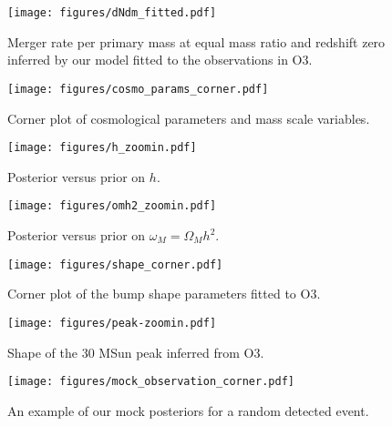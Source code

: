 \documentclass[modern]{aastex631}
\begin{document}
\begin{figure}
    \begin{center}
        \texttt{[image: figures/dNdm\_fitted.pdf]}
    \end{center}
    \caption{Merger rate per primary mass at equal mass ratio and redshift zero inferred by our model fitted to the observations in O3.}
    \label{fig:dNdm_fitted}
\end{figure}

\begin{figure}
    \begin{center}
        \texttt{[image: figures/cosmo\_params\_corner.pdf]}
    \end{center}
    \caption{Corner plot of cosmological parameters and mass scale variables.}
    \label{fig:cosmo-params-corner}
\end{figure}

\begin{figure}
    \begin{center}
        \texttt{[image: figures/h\_zoomin.pdf]}
    \end{center}
    \caption{Posterior versus prior on $h$.}
    \label{fig:h-zoomin}
\end{figure}

\begin{figure}
    \begin{center}
        \texttt{[image: figures/omh2\_zoomin.pdf]}
    \end{center}
    \caption{Posterior versus prior on $\omega_M = \Omega_M h^2$.}
    \label{fig:omh2-zoomin}
\end{figure}

\begin{figure}
    \begin{center}
        \texttt{[image: figures/shape\_corner.pdf]}
    \end{center}
    \caption{Corner plot of the bump shape parameters fitted to O3.}
    \label{fig:shape-corner}
\end{figure}

\begin{figure}
    \begin{center}
        \texttt{[image: figures/peak-zoomin.pdf]}
    \end{center}
    \caption{Shape of the 30 MSun peak inferred from O3.}
    \label{fig:peak-zoomin}
\end{figure}

\begin{figure}
    \begin{center}
        \texttt{[image: figures/mock\_observation\_corner.pdf]}
    \end{center}
    \caption{An example of our mock posteriors for a random detected event.}
    \label{fig:mock-observation-corner}
\end{figure}


\end{document}
